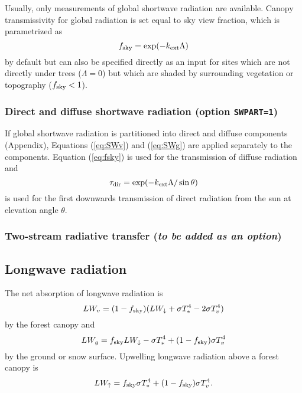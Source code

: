 \documentclass{article}
\begin{document}
Usually, only measurements of global shortwave radiation are available. Canopy transmissivity for global radiation is set equal to sky view fraction, which is parametrized as
\begin{equation}
f_{\rm sky} = \exp(-k_{\rm ext}\Lambda)
\label{eq:fsky}
\end{equation}
by default but can also be specified directly as an input for sites which are not directly under trees  ($\Lambda=0$) but which are shaded by surrounding vegetation or topography ($f_{\rm sky}<1$).

\subsubsection{Direct and diffuse shortwave radiation (option {\tt SWPART=1})}
If global shortwave radiation is partitioned into direct and diffuse components (Appendix), Equations 
(\ref{eq:SWv}) and (\ref{eq:SWg}) are applied separately to the components. Equation (\ref{eq:fsky}) is used for the transmission of diffuse radiation and 
\begin{equation}
\tau_{\rm dir} = \exp(-k_{\rm ext}\Lambda/\sin\theta)
\end{equation}
is used for the first downwards transmission of direct radiation from the sun at elevation angle $\theta$.

\subsubsection{Two-stream radiative transfer ({\it to be added as an option})}

\subsection{Longwave radiation}
The net absorption of longwave radiation is
\begin{equation}
LW_v = (1 - f_{\rm sky}) (LW_\downarrow  + \sigma T_*^4 - 2\sigma T_v^4) 
\end{equation} 
by the forest canopy and
\begin{equation}
LW_g = f_{\rm sky}LW_\downarrow - \sigma T_*^4  + (1 - f_{\rm sky})\sigma T_v^4
\end{equation}
by the ground or snow surface. Upwelling longwave radiation above a forest canopy is
\begin{equation}
LW_\uparrow = f_{\rm sky}\sigma T_*^4  + (1 - f_{\rm sky})\sigma T_v^4.
\end{equation}
\end{document}
